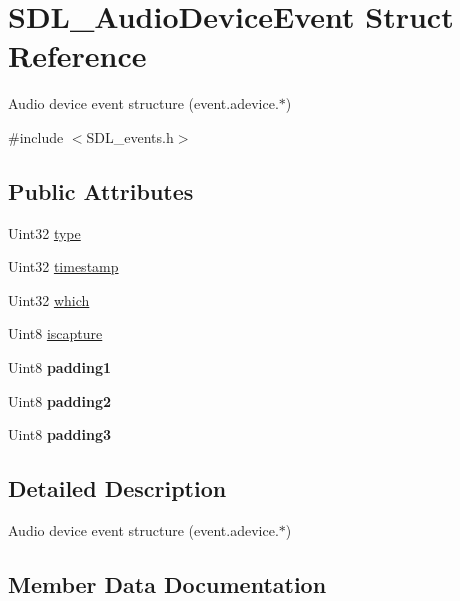 \hypertarget{structSDL__AudioDeviceEvent}{}\section{S\+D\+L\+\_\+\+Audio\+Device\+Event Struct Reference}
\label{structSDL__AudioDeviceEvent}


Audio device event structure (event.\+adevice.$\ast$)  




{\ttfamily \#include $<$S\+D\+L\+\_\+events.\+h$>$}

\subsection*{Public Attributes}
\begin{DoxyCompactItemize}
\item 
Uint32 \hyperlink{structSDL__AudioDeviceEvent_ae68c3bd49b49608711a17395c7cbfe58}{type}
\item 
Uint32 \hyperlink{structSDL__AudioDeviceEvent_aa471680486a6103eafc9af569016df57}{timestamp}
\item 
Uint32 \hyperlink{structSDL__AudioDeviceEvent_ac91d70fd4e1dd596185fed061388896c}{which}
\item 
Uint8 \hyperlink{structSDL__AudioDeviceEvent_a1482dcd50b47046ef8e9bfa7cc7457d9}{iscapture}
\item 
\mbox{\label{structSDL__AudioDeviceEvent_ad6efdec7189e735f4a05fc123c0cb723}} 
Uint8 {\bfseries padding1}
\item 
\mbox{\label{structSDL__AudioDeviceEvent_adf9bebd56d707860045d31359535a2a4}} 
Uint8 {\bfseries padding2}
\item 
\mbox{\label{structSDL__AudioDeviceEvent_af3163ba92c77f08a4f0d8f043f24c96c}} 
Uint8 {\bfseries padding3}
\end{DoxyCompactItemize}


\subsection{Detailed Description}
Audio device event structure (event.\+adevice.$\ast$) 

\subsection{Member Data Documentation}
\mbox{\label{structSDL__AudioDeviceEvent_a1482dcd50b47046ef8e9bfa7cc7457d9}} 
